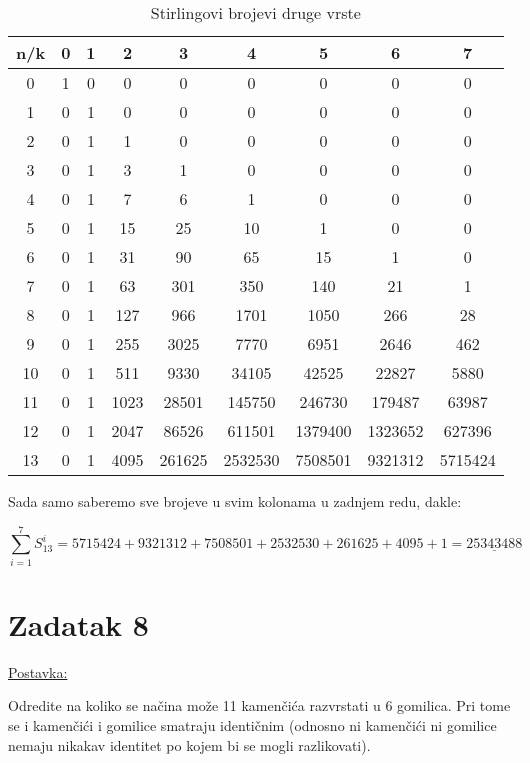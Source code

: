\documentclass[12pt]{article}
\begin{document}
\begin{table}[]
\centering
\caption{Stirlingovi brojevi druge vrste}
\label{my-label}
\begin{tabular}{@{}c|cccccccc@{}}
n/k & 0 & 1 & 2    & 3      & 4       & 5       & 6       & 7       \\ \midrule
0   & 1 & 0 & 0    & 0      & 0       & 0       & 0       & 0       \\
1   & 0 & 1 & 0    & 0      & 0       & 0       & 0       & 0       \\
2   & 0 & 1 & 1    & 0      & 0       & 0       & 0       & 0       \\
3   & 0 & 1 & 3    & 1      & 0       & 0       & 0       & 0       \\
4   & 0 & 1 & 7    & 6      & 1       & 0       & 0       & 0       \\
5   & 0 & 1 & 15   & 25     & 10      & 1       & 0       & 0       \\
6   & 0 & 1 & 31   & 90     & 65      & 15      & 1       & 0       \\
7   & 0 & 1 & 63   & 301    & 350     & 140     & 21      & 1       \\
8   & 0 & 1 & 127  & 966    & 1701    & 1050    & 266     & 28      \\
9   & 0 & 1 & 255  & 3025   & 7770    & 6951    & 2646    & 462     \\
10  & 0 & 1 & 511  & 9330   & 34105   & 42525   & 22827   & 5880    \\
11  & 0 & 1 & 1023 & 28501  & 145750  & 246730  & 179487  & 63987   \\
12  & 0 & 1 & 2047 & 86526  & 611501  & 1379400 & 1323652 & 627396  \\
13  & 0 & 1 & 4095 & 261625 & 2532530 & 7508501 & 9321312 & 5715424
\end{tabular}
\end{table}
\newpage
Sada samo saberemo sve brojeve u svim kolonama u zadnjem redu, dakle:

$$\sum_{i=1}^7 S_{13}^i = 5715424 + 9321312 +  7508501 + 2532530 + 261625 + 4095 + 1 = \underline{25343488}$$

\newpage
\section*{Zadatak 8\label{Z8}}	 

\underline{Postavka:}

Odredite na koliko se načina može 11 kamenčića razvrstati u 6 gomilica. Pri tome se i kamenčići i gomilice smatraju identičnim (odnosno ni kamenčići ni gomilice nemaju nikakav identitet po kojem bi se mogli razlikovati).
\end{document}
